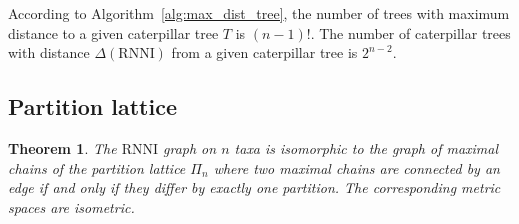 \documentclass{amsart}
\newcommand{\rnni}{\mathrm{RNNI}}
\newtheorem{theorem}[definition]{Theorem}
\begin{document}
According to Algorithm~\ref{alg:max_dist_tree}, the number of trees with maximum distance to a given caterpillar tree $T$ is $(n-1)!$.
The number of caterpillar trees with distance $\Delta(\rnni)$ from a given caterpillar tree is $2^{n-2}$.


\subsection{Partition lattice}


\begin{theorem}
The $\rnni$ graph on $n$ taxa is isomorphic to the graph of maximal chains of the partition lattice $\Pi_n$ where two maximal chains are connected by an edge if and only if they differ by exactly one partition.
The corresponding metric spaces are isometric.
\end{theorem}


\printbibliography
\end{document}
